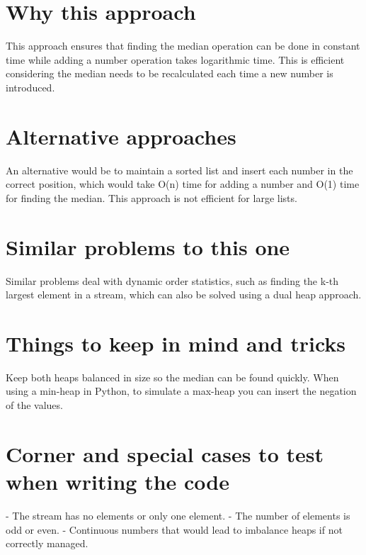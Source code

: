 \section*{Why this approach}
This approach ensures that finding the median operation can be done in constant time while adding a number operation takes logarithmic time. This is efficient considering the median needs to be recalculated each time a new number is introduced.

\section*{Alternative approaches}
An alternative would be to maintain a sorted list and insert each number in the correct position, which would take O(n) time for adding a number and O(1) time for finding the median. This approach is not efficient for large lists.

\section*{Similar problems to this one}
Similar problems deal with dynamic order statistics, such as finding the k-th largest element in a stream, which can also be solved using a dual heap approach.

\section*{Things to keep in mind and tricks}
Keep both heaps balanced in size so the median can be found quickly. When using a min-heap in Python, to simulate a max-heap you can insert the negation of the values.

\section*{Corner and special cases to test when writing the code}
- The stream has no elements or only one element.
- The number of elements is odd or even.
- Continuous numbers that would lead to imbalance heaps if not correctly managed.